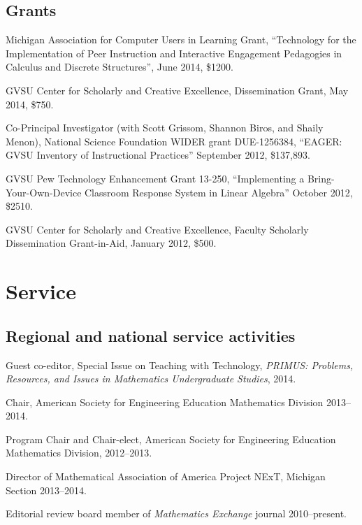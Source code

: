 \documentclass[letterpaper]{article}
\renewenvironment{itemize}{
  \begin{list}{}{
    \setlength{\leftmargin}{1.5em}
	\setlength{\itemsep}{0in}
  }
}{
  \end{list}
}
\begin{document}
\subsection*{Grants}
\begin{itemize}
	\item Michigan Association for Computer Users in Learning Grant, ``Technology for the Implementation of Peer Instruction and Interactive Engagement Pedagogies in Calculus and Discrete Structures'', June 2014, \$1200. 
	\item GVSU Center for Scholarly and Creative Excellence, Dissemination Grant, May 2014, \$750. 
	\item Co-Principal Investigator (with Scott Grissom, Shannon Biros, and Shaily Menon), National Science Foundation WIDER grant DUE-1256384, ``EAGER: GVSU Inventory of Instructional Practices'' September 2012, \$137,893.  
	\item GVSU Pew Technology Enhancement Grant 13-250, ``Implementing a Bring-Your-Own-Device Classroom Response System in Linear Algebra'' October 2012, \$2510. 
	\item GVSU Center for Scholarly and Creative Excellence, Faculty Scholarly Dissemination Grant-in-Aid, January 2012, \$500. 
\end{itemize}






\section*{Service}

\subsection*{Regional and national service activities}
\begin{itemize}
	\item Guest co-editor, Special Issue on Teaching with Technology, \emph{PRIMUS: Problems, Resources, and Issues in Mathematics Undergraduate Studies}, 2014.
	\item Chair, American Society for Engineering Education Mathematics Division 2013--2014. 
	\item Program Chair and Chair-elect, American Society for Engineering Education Mathematics Division, 2012--2013. 
	\item Director of Mathematical Association of America Project NExT, Michigan Section 2013--2014. 
	\item Editorial review board member of \emph{Mathematics Exchange} journal 2010--present. 
\end{itemize}
\end{document}
